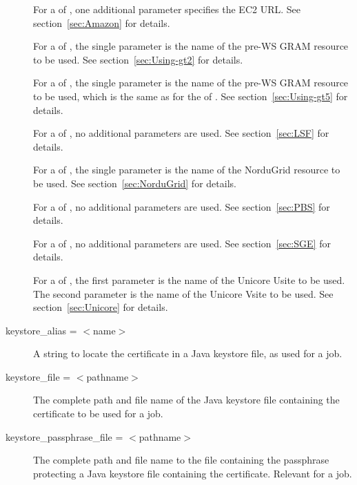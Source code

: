 \begin{description}
For a  of ,
one additional parameter specifies the EC2 URL. 
See section~\ref{sec:Amazon}  for details. 

For a  of ,
the single parameter is the name of the pre-WS GRAM resource to be used.
See section~\ref{sec:Using-gt2} for details.

For a  of ,
the single parameter is the name of the pre-WS GRAM resource to be used,
which is the same as for the  of .
See section~\ref{sec:Using-gt5} for details.

For a  of , no additional
parameters are used.
See section~\ref{sec:LSF} for details.

For a  of ,
the single parameter is the name of the NorduGrid resource to be used.
See section~\ref{sec:NorduGrid} for details.

For a  of , no additional
parameters are used.
See section~\ref{sec:PBS} for details.

For a  of , no additional
parameters are used.
See section~\ref{sec:SGE} for details.

For a  of ,
the first parameter is the name of the Unicore Usite to be used.
The second parameter is the name of the Unicore Vsite to be used.
See section~\ref{sec:Unicore} for details.



\label{condor-submit-keystore-alias}
\item[keystore\_alias = $<$name$>$]
A string to locate the certificate in a Java keystore file,
as used for a  job.


\label{condor-submit-keystore-file}
\item[keystore\_file = $<$pathname$>$]
The complete path and file name of the Java keystore file
containing the certificate to be used for a  job.

\label{condor-submit-passphrase-file}
\item[keystore\_passphrase\_file = $<$pathname$>$]
The complete path and file name
to the file containing the passphrase protecting a Java keystore
file containing the certificate.
Relevant for a  job.


\end{description}
